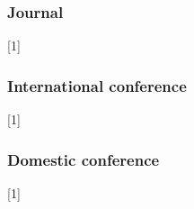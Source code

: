 \fontsize{20.74pt}{0.6\baselineskip} \selectfont {\bfseries Publications}
\fontsize{11pt}{17 pt}\selectfont		
\subsubsection{Journal}
\noindent
{}
\setlength{\hangindent}{1.8em}
[1] 


\subsubsection{International conference}
\noindent
{}
\setlength{\hangindent}{1.8em}
[1] 


\subsubsection{Domestic conference}
\noindent
{}
\setlength{\hangindent}{1.8em}
[1] 

